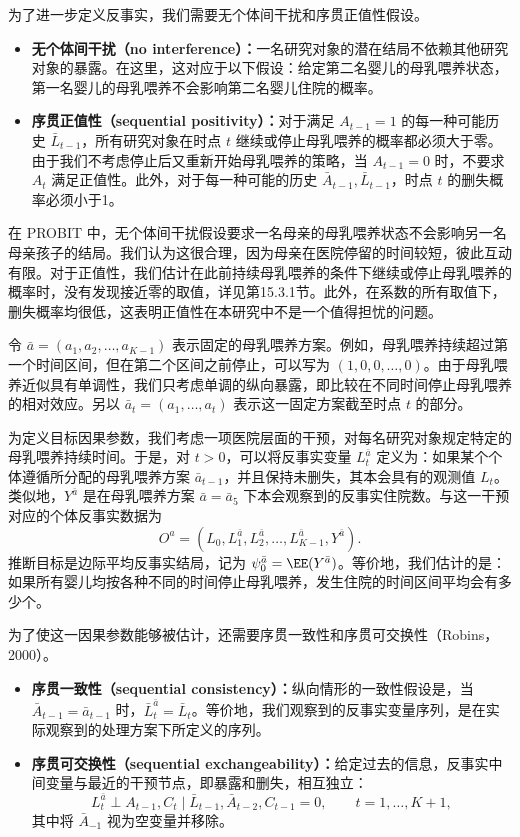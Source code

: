 为了进一步定义反事实，我们需要无个体间干扰和序贯正值性假设。
\begin{itemize}
\item \textbf{无个体间干扰（no interference）：}一名研究对象的潜在结局不依赖其他研究对象的暴露。在这里，这对应于以下假设：给定第二名婴儿的母乳喂养状态，第一名婴儿的母乳喂养不会影响第二名婴儿住院的概率。
\item \textbf{序贯正值性（sequential positivity）：}对于满足 $A_{t-1}=1$ 的每一种可能历史 $\bar L_{t-1}$，所有研究对象在时点 $t$ 继续或停止母乳喂养的概率都必须大于零。由于我们不考虑停止后又重新开始母乳喂养的策略，当 $A_{t-1}=0$ 时，不要求 $A_t$ 满足正值性。此外，对于每一种可能的历史 $\bar A_{t-1},\bar L_{t-1}$，时点 $t$ 的删失概率必须小于1。
\end{itemize}

在 PROBIT 中，无个体间干扰假设要求一名母亲的母乳喂养状态不会影响另一名母亲孩子的结局。我们认为这很合理，因为母亲在医院停留的时间较短，彼此互动有限。对于正值性，我们估计在此前持续母乳喂养的条件下继续或停止母乳喂养的概率时，没有发现接近零的取值，详见第15.3.1节。此外，在系数的所有取值下，删失概率均很低，这表明正值性在本研究中不是一个值得担忧的问题。

令 $\bar a=(a_1,a_2,\ldots,a_{K-1})$ 表示固定的母乳喂养方案。例如，母乳喂养持续超过第一个时间区间，但在第二个区间之前停止，可以写为 $(1,0,0,\ldots,0)$。由于母乳喂养近似具有单调性，我们只考虑单调的纵向暴露，即比较在不同时间停止母乳喂养的相对效应。另以 $\bar a_t=(a_1,\ldots,a_t)$ 表示这一固定方案截至时点 $t$ 的部分。

为定义目标因果参数，我们考虑一项医院层面的干预，对每名研究对象规定特定的母乳喂养持续时间。于是，对 $t>0$，可以将反事实变量 $L_t^{\bar a}$ 定义为：如果某个个体遵循所分配的母乳喂养方案 $\bar a_{t-1}$，并且保持未删失，其本会具有的观测值 $L_t$。类似地，$Y^{\bar a}$ 是在母乳喂养方案 $\bar a=\bar a_5$ 下本会观察到的反事实住院数。与这一干预对应的个体反事实数据为
\[
 O^a=(L_0,L_1^{\bar a},L_2^{\bar a},\ldots,L_{K-1}^{\bar a},Y^{\bar a}).
\]
推断目标是边际平均反事实结局，记为 $\psi_0^{\bar a}=\EE(Y^{\bar a})$。等价地，我们估计的是：如果所有婴儿均按各种不同的时间停止母乳喂养，发生住院的时间区间平均会有多少个。

为了使这一因果参数能够被估计，还需要序贯一致性和序贯可交换性（Robins，2000）。
\begin{itemize}
\item \textbf{序贯一致性（sequential consistency）：}纵向情形的一致性假设是，当 $\bar A_{t-1}=\bar a_{t-1}$ 时，$\bar L_t^{\bar a}=\bar L_t$。等价地，我们观察到的反事实变量序列，是在实际观察到的处理方案下所定义的序列。
\item \textbf{序贯可交换性（sequential exchangeability）：}给定过去的信息，反事实中间变量与最近的干预节点，即暴露和删失，相互独立：
\[
 L_t^{\bar a}\perp A_{t-1},C_t
 \mid \bar L_{t-1},\bar A_{t-2},C_{t-1}=0,
 \qquad t=1,\ldots,K+1,
\]
其中将 $\bar A_{-1}$ 视为空变量并移除。
\end{itemize}


